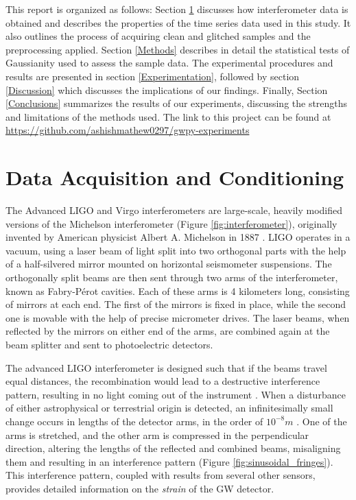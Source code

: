 \documentclass[12pt]{article}
\begin{document}
\noindent This report is organized as follows: Section \ref{Data} discusses how interferometer data is obtained and describes the properties of the time series data used in this study. It also outlines the process of acquiring clean and glitched samples and the preprocessing applied. Section \ref{Methods} describes in detail the statistical tests of Gaussianity used to assess the sample data. The experimental procedures and results are presented in section \ref{Experimentation}, followed by section \ref{Discussion} which discusses the implications of our findings. Finally, Section \ref{Conclusions} summarizes the results of our experiments, discussing the strengths and limitations of the methods used. The link to this project can be found at \url{https://github.com/ashishmathew0297/gwpy-experiments}

\pagebreak

\section{Data Acquisition and Conditioning}\label{Data}

\medskip
\noindent The Advanced LIGO and Virgo interferometers are large-scale, heavily modified versions of the Michelson interferometer (Figure \ref{fig:interferometer}), originally invented by American physicist Albert A. Michelson in 1887 \cite{weiss_report_1972,collaboration_gwtc-3_2023}. LIGO operates in a vacuum, using a laser beam of light split into two orthogonal parts with the help of a half-silvered mirror mounted on horizontal seismometer suspensions. The orthogonally split beams are then sent through two arms of the interferometer, known as Fabry-Pérot cavities. Each of these arms is 4 kilometers long, consisting of mirrors at each end. The first of the mirrors is fixed in place, while the second one is movable with the help of precise micrometer drives. The laser beams, when reflected by the mirrors on either end of the arms, are combined again at the beam splitter and sent to photoelectric detectors.

\medskip
\noindent The advanced LIGO interferometer is designed such that if the beams travel equal distances, the recombination would lead to a destructive interference pattern, resulting in no light coming out of the instrument \cite{ligo_what_interferometer}. When a disturbance of either astrophysical or terrestrial origin is detected, an infinitesimally small change occurs in lengths of the detector arms, in the order of $10^{-8}m$ \cite{ghonge_assessing_2024}. One of the arms is stretched, and the other arm is compressed in the perpendicular direction, altering the lengths of the reflected and combined beams, misaligning them and resulting in an interference pattern (Figure \ref{fig:sinusoidal_fringes}). This interference pattern, coupled with results from several other sensors, provides detailed information on the \textit{strain} of the GW detector.
\end{document}
